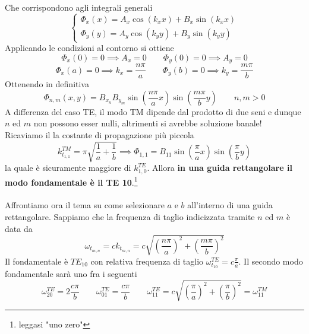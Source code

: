 \documentclass{book}
\begin{document}
    Che corrispondono agli integrali generali
    \begin{equation}
        \begin{cases}
            \displaystyle \Phi_{x}(x) = A_{x}\cos(k_{x}x)+B_{x}\sin(k_{x}x) \\
            \displaystyle \Phi_{y}(y) = A_{y}\cos(k_{y}y)+B_{y}\sin(k_{y}y)
        \end{cases}
    \end{equation}
    Applicando le condizioni al contorno si ottiene
    \begin{equation}
        \Phi_{x} (0) = 0 \implies A_{x} = 0 \qquad \Phi_{y}(0) = 0 \implies A_{y} = 0
    \end{equation}
    \begin{equation}
        \Phi_{x}(a) = 0 \implies k_{x} = \frac{n\pi}{a} \qquad \Phi_{y}(b)=0 \implies k_{y} = \frac{m \pi}{b}  
    \end{equation}
    Ottenendo in definitiva
    \begin{equation}
        \Phi_{n,m} (x,y) = B_{x_{n}}B_{y_{m}}\sin(\frac{n \pi}{a}x)\sin(\frac{m \pi}{b}y) \qquad n, m > 0
    \end{equation}
    A differenza del caso TE, il modo TM dipende dal prodotto di due seni e dunque $n$ ed $m$ non possono esser nulli,
    altrimenti si avrebbe soluzione banale! \\
    Ricaviamo il la costante di propagazione più piccola
    \begin{equation}
        k_{t_{1,1}} ^{TM}= \pi\sqrt{\frac{1}{a}+\frac{1}{b}} \implies \Phi_{1,1} = B_{11}\sin(\frac{\pi}{a}x)\sin(\frac{\pi}{b}y)
    \end{equation}
    la quale è sicuramente maggiore di $k_{1,0} ^{TE}$. Allora \textbf{in una guida rettangolare il modo fondamentale è il TE 10}.\footnote{leggasi "uno zero"}
    \\ \\ 
    Affrontiamo ora il tema su come selezionare $a$ e $b$ all'interno di una guida rettangolare. Sappiamo che la frequenza di taglio indicizzata tramite $n$ ed $m$ è data da 
    \begin{equation}
        \omega_{t_{m,n}} = c k_{t_{m,n}} = c \sqrt{(\frac{n \pi}{a})^{2}+(\frac{m \pi}{b})^{2}} 
    \end{equation}
    Il fondamentale è $TE_{10}$ con relativa frequenza di taglio $\omega_{t_{10}} ^{TE} = c\frac{\pi}{a}$. Il secondo modo fondamentale sarà uno fra i seguenti
    \begin{equation}
        \omega_{20} ^{TE} = 2 \frac{c\pi}{b} \qquad \omega_{01} ^{TE} = \frac{c\pi}{b} \qquad \omega_{11} ^{TE} = c\sqrt{(\frac{\pi}{a})^{2}+(\frac{\pi}{b})^{2}} = \omega_{11} ^{TM}
    \end{equation}
\end{document}
